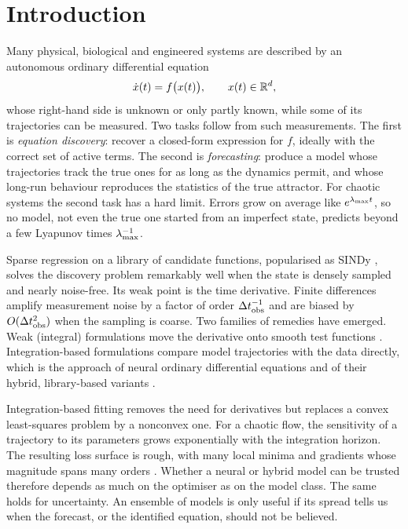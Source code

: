 \chapter{Introduction}\label{ch:intro}

Many physical, biological and engineered systems are described by an autonomous ordinary differential equation
\begin{equation}\label{eq:ode}
  \dot{x}(t) = f\big(x(t)\big), \qquad x(t)\in\mathbb{R}^d,
\end{equation}
whose right-hand side is unknown or only partly known, while some of its trajectories can be measured. Two tasks follow from such measurements. The first is \emph{equation discovery}: recover a closed-form expression for $f$, ideally with the correct set of active terms. The second is \emph{forecasting}: produce a model whose trajectories track the true ones for as long as the dynamics permit, and whose long-run behaviour reproduces the statistics of the true attractor. For chaotic systems the second task has a hard limit. Errors grow on average like $e^{\lambda_{\max} t}$, so no model, not even the true one started from an imperfect state, predicts beyond a few Lyapunov times $\lambda_{\max}^{-1}$.

Sparse regression on a library of candidate functions, popularised as SINDy \parencite{brunton2016sindy}, solves the discovery problem remarkably well when the state is densely sampled and nearly noise-free. Its weak point is the time derivative. Finite differences amplify measurement noise by a factor of order $\Delta t_{\mathrm{obs}}^{-1}$ and are biased by $O(\Delta t_{\mathrm{obs}}^2)$ when the sampling is coarse. Two families of remedies have emerged. Weak (integral) formulations move the derivative onto smooth test functions \parencite{schaeffer2017integral,reinbold2020weak,messenger2021wsindy}. Integration-based formulations compare model trajectories with the data directly, which is the approach of neural ordinary differential equations \parencite{chen2018node} and of their hybrid, library-based variants \parencite{rackauckas2020ude,goyal2022rk4sindy}.

Integration-based fitting removes the need for derivatives but replaces a convex least-squares problem by a nonconvex one. For a chaotic flow, the sensitivity of a trajectory to its parameters grows exponentially with the integration horizon. The resulting loss surface is rough, with many local minima and gradients whose magnitude spans many orders \parencite{ribeiro2020smoothness}. Whether a neural or hybrid model can be trusted therefore depends as much on the optimiser as on the model class. The same holds for uncertainty. An ensemble of models is only useful if its spread tells us when the forecast, or the identified equation, should not be believed.

